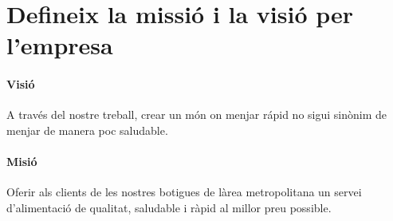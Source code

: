 \section{Defineix la missió i la visió per l’empresa}

\paragraph{Visió}
A través del nostre treball, crear un món on menjar rápid no sigui sinònim de menjar de manera poc saludable.

\paragraph{Misió}
Oferir als clients de les nostres botigues de làrea metropolitana un servei d'alimentació de qualitat, saludable i ràpid al millor preu possible.
